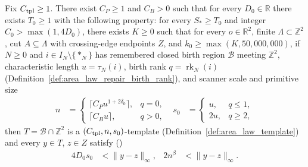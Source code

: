 \begin{lemma}
    \label{thm:area_law_repair_birth_templates}
    \leanok
    Fix $C_{\rm tpl}\ge1$. There exist $C_P\ge1$ and $C_B>0$ such that for every $D_0\in\mathbb R$
    there exists $T_0\ge1$ with the following property: for every $S_*\ge T_0$ and integer
    $C_0>\max(1,4D_0)$, there exists $K\ge0$ such that for every $o\in\mathbb R^2$, finite
    $\Lambda\subset\mathbb Z^2$, cut $A\subseteq\Lambda$ with crossing-edge endpoints $Z$,
    and $k_0\ge\max(K,50{,}000{,}000)$, if $N\ge0$ and $i\in I_N\setminus\{*_N\}$ has
    remembered closed birth region $\mathcal B$ meeting $\mathbb Z^2$, characteristic length
    $u=\tau_N(i)$, birth rank $q=\operatorname{rk}_N(i)$ (Definition~\ref{def:area_law_repair_birth_rank}),
    and scanner scale and primitive size
    \begin{align}
        n   & =
        \begin{cases}
            \bigl\lceil C_Pu^{1+2\delta_0}\bigr\rceil, & q=0, \\
            \lceil C_Bu\rceil,                         & q>0,
        \end{cases}
            &
        s_0 & =
        \begin{cases}
            u,  & q\le1, \\
            2u, & q\ge2,
        \end{cases}
        \label{eq:area_law_birth_template_scales}
    \end{align}
    then $T=\mathcal B\cap\mathbb Z^2$ is a $(C_{\rm tpl},n,s_0)$-template
    (Definition~\ref{def:area_law_template}) and every $y\in T$, $z\in Z$ satisfy
    (\cite[Section~11]{OpenAI2026AreaLaw})
    \begin{align}
        4D_0s_0  & <\|y-z\|_\infty, &
        2n^\beta & <\|y-z\|_\infty.
        \label{eq:area_law_birth_template_clearance}
    \end{align}
\end{lemma}
